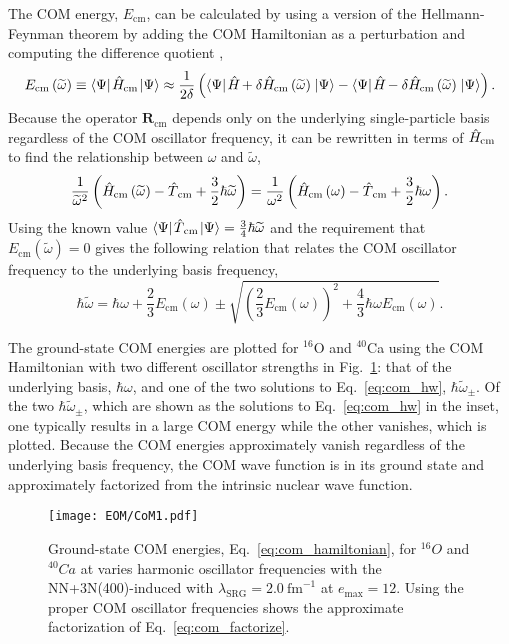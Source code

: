 \documentclass[thesis.tex]{subfiles}
\begin{document}
The COM energy, $E_{\mathrm{cm}}$, can be calculated by using a version of the Hellmann-Feynman theorem by adding the COM Hamiltonian as a perturbation and computing the difference quotient \cite{DIERCKSEN198129,ERNZERHOF199359},
\begin{equation} \label{eq:com_energy}
  E_{\mathrm{cm}}\left(\widetilde{\omega}\right) \equiv \langle \Psi |\hspace{1pt}\hat{H}\hspace{-1pt}_{\mathrm{cm}}\hspace{1pt}\lvert \Psi \rangle \approx \frac{1}{2\delta}\left(\langle \Psi |\hspace{1pt}\hat{H}\hspace{-1pt} + \delta\hat{H}\hspace{-1pt}_{\mathrm{cm}}\left(\widetilde{\omega}\right)\hspace{1pt}\lvert \Psi \rangle - \langle \Psi |\hspace{1pt}\hat{H}\hspace{-1pt} - \delta\hat{H}\hspace{-1pt}_{\mathrm{cm}}\left(\widetilde{\omega}\right)\hspace{1pt}\lvert \Psi \rangle\right).
\end{equation}
Because the operator $\mathbf{R}_{\mathrm{cm}}$ depends only on the underlying single-particle basis regardless of the COM oscillator frequency, it can be rewritten in terms of $\hat{H}\hspace{-1pt}_{\mathrm{cm}}$ to find the relationship between $\omega$ and $\widetilde{\omega}$,
\begin{equation}
  \frac{1}{\widetilde{\omega}^{2}}\left(\hat{H}\hspace{-1pt}_{\mathrm{cm}}\left(\widetilde{\omega}\right) - \hat{T}\hspace{-0.25pt}_{\mathrm{cm}} + \frac{3}{2}\hbar\widetilde{\omega}\right) = \frac{1}{\omega^{2}}\left(\hat{H}\hspace{-1pt}_{\mathrm{cm}}\left(\omega\right) - \hat{T}\hspace{-0.25pt}_{\mathrm{cm}} + \frac{3}{2}\hbar\omega\right).
\end{equation}
Using the known value $\langle \Psi |\hspace{1pt}\hat{T}\hspace{-0.25pt}_{\mathrm{cm}}\hspace{1pt}\lvert \Psi \rangle = \frac{3}{4}\hbar\widetilde{\omega}$ and the requirement that $E_{\mathrm{cm}}\left(\widetilde{\omega}\right)=0$ gives the following relation that relates the COM oscillator frequency to the underlying basis frequency,
\begin{equation} \label{eq:com_hw}
  \hbar\widetilde{\omega} = \hbar\omega + \frac{2}{3}E_{\mathrm{cm}}\left(\omega\right) \pm \sqrt{\left(\frac{2}{3}E_{\mathrm{cm}}\left(\omega\right)\right)^{2} + \frac{4}{3}\hbar\omega E_{\mathrm{cm}}\left(\omega\right)}.
\end{equation}

The ground-state COM energies are plotted for ${}^{16}$O and ${}^{40}$Ca using the COM Hamiltonian with two different oscillator strengths in Fig.\ \ref{fig:CoM_Ground_State}: that of the underlying basis, $\hbar\omega$, and one of the two solutions to Eq.\ \eqref{eq:com_hw}, $\hbar\widetilde{\omega}_{\pm}$.  Of the two $\hbar\widetilde{\omega}_{\pm}$, which are shown as the solutions to Eq.\ \eqref{eq:com_hw} in the inset, one typically results in a large COM energy while the other vanishes, which is plotted.  Because the COM energies approximately vanish regardless of the underlying basis frequency, the COM wave function is in its ground state and approximately factorized from the intrinsic nuclear wave function.
\begin{figure}[h]
  \centering
  \texttt{[image: EOM/CoM1.pdf]}
  \caption{Ground-state COM energies, Eq.\ \eqref{eq:com_hamiltonian}, for ${}^{16}O$ and ${}^{40}Ca$ at varies harmonic oscillator frequencies with the NN+3N(400)-induced with $\lambda_{\mathrm{SRG}}=2.0\ \mathrm{fm}^{-1}$ at $e_{\mathrm{max}}=12$.  Using the proper COM oscillator frequencies shows the approximate factorization of Eq.\ \eqref{eq:com_factorize}.}
  \label{fig:CoM_Ground_State}
\end{figure}
\end{document}
